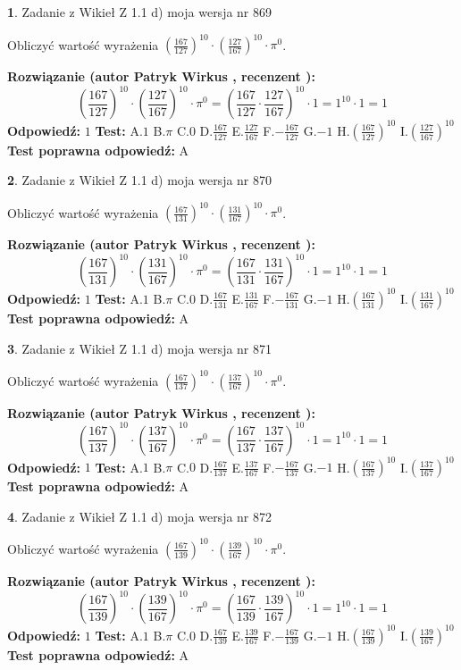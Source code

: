 \documentclass[12pt, a4paper]{article}
\theoremstyle{definition} %
\newtheorem{zad}{}
\newcommand{\zadStart}[1]{\begin{zad}#1\newline}
\newcommand{\zadStop}{\end{zad}}
\newcommand{\rozwStart}[2]{\noindent \textbf{Rozwiązanie (autor #1 , recenzent #2): }\newline}
\newcommand{\rozwStop}{\newline}
\newcommand{\odpStart}{\noindent \textbf{Odpowiedź:}\newline}
\newcommand{\odpStop}{\newline}
\newcommand{\testStart}{\noindent \textbf{Test:}\newline}
\newcommand{\testStop}{\newline}
\newcommand{\kluczStart}{\noindent \textbf{Test poprawna odpowiedź:}\newline}
\newcommand{\kluczStop}{\newline}
\begin{document}
\zadStart{Zadanie z Wikieł Z 1.1 d) moja wersja nr 869}

Obliczyć wartość wyrażenia $(\frac{167}{127})^{10} \cdot (\frac{127}{167})^{10} \cdot \pi^{0}$.
\zadStop
\rozwStart{Patryk Wirkus}{}
$$(\frac{167}{127})^{10} \cdot (\frac{127}{167})^{10} \cdot \pi^{0} = (\frac{167}{127} \cdot \frac{127}{167})^{10} \cdot 1 = 1^{10} \cdot 1 = 1$$
\rozwStop
\odpStart
$1$
\odpStop
\testStart
A.$1$ B.$\pi$ C.$0$ D.$\frac{167}{127}$ E.$\frac{127}{167}$
F.$-\frac{167}{127}$ G.$-1$
H.$(\frac{167}{127})^{10}$
I.$(\frac{127}{167})^{10}$
\testStop
\kluczStart
A
\kluczStop



\zadStart{Zadanie z Wikieł Z 1.1 d) moja wersja nr 870}

Obliczyć wartość wyrażenia $(\frac{167}{131})^{10} \cdot (\frac{131}{167})^{10} \cdot \pi^{0}$.
\zadStop
\rozwStart{Patryk Wirkus}{}
$$(\frac{167}{131})^{10} \cdot (\frac{131}{167})^{10} \cdot \pi^{0} = (\frac{167}{131} \cdot \frac{131}{167})^{10} \cdot 1 = 1^{10} \cdot 1 = 1$$
\rozwStop
\odpStart
$1$
\odpStop
\testStart
A.$1$ B.$\pi$ C.$0$ D.$\frac{167}{131}$ E.$\frac{131}{167}$
F.$-\frac{167}{131}$ G.$-1$
H.$(\frac{167}{131})^{10}$
I.$(\frac{131}{167})^{10}$
\testStop
\kluczStart
A
\kluczStop



\zadStart{Zadanie z Wikieł Z 1.1 d) moja wersja nr 871}

Obliczyć wartość wyrażenia $(\frac{167}{137})^{10} \cdot (\frac{137}{167})^{10} \cdot \pi^{0}$.
\zadStop
\rozwStart{Patryk Wirkus}{}
$$(\frac{167}{137})^{10} \cdot (\frac{137}{167})^{10} \cdot \pi^{0} = (\frac{167}{137} \cdot \frac{137}{167})^{10} \cdot 1 = 1^{10} \cdot 1 = 1$$
\rozwStop
\odpStart
$1$
\odpStop
\testStart
A.$1$ B.$\pi$ C.$0$ D.$\frac{167}{137}$ E.$\frac{137}{167}$
F.$-\frac{167}{137}$ G.$-1$
H.$(\frac{167}{137})^{10}$
I.$(\frac{137}{167})^{10}$
\testStop
\kluczStart
A
\kluczStop



\zadStart{Zadanie z Wikieł Z 1.1 d) moja wersja nr 872}

Obliczyć wartość wyrażenia $(\frac{167}{139})^{10} \cdot (\frac{139}{167})^{10} \cdot \pi^{0}$.
\zadStop
\rozwStart{Patryk Wirkus}{}
$$(\frac{167}{139})^{10} \cdot (\frac{139}{167})^{10} \cdot \pi^{0} = (\frac{167}{139} \cdot \frac{139}{167})^{10} \cdot 1 = 1^{10} \cdot 1 = 1$$
\rozwStop
\odpStart
$1$
\odpStop
\testStart
A.$1$ B.$\pi$ C.$0$ D.$\frac{167}{139}$ E.$\frac{139}{167}$
F.$-\frac{167}{139}$ G.$-1$
H.$(\frac{167}{139})^{10}$
I.$(\frac{139}{167})^{10}$
\testStop
\kluczStart
A
\kluczStop
\end{document}
